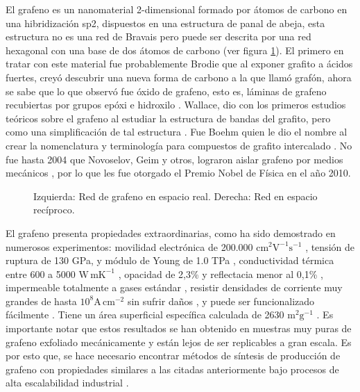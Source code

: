 El grafeno es un nanomaterial 2-dimensional formado por átomos de carbono en una hibridización sp2, dispuestos en una estructura de panal de abeja, esta estructura no es una red de Bravais pero puede ser descrita por una red hexagonal con una base de dos átomos de carbono (ver figura \ref{fig_graphene_lattice}). El primero en tratar con este material fue probablemente Brodie \citep{Brodie1859} que al exponer grafito a ácidos fuertes, creyó descubrir una nueva forma de carbono a la que llamó grafón, ahora se sabe que lo que observó fue óxido de grafeno, esto es, láminas de grafeno recubiertas por grupos epóxi e hidroxilo \citep{Geim2012}. Wallace, dio con los primeros estudios teóricos sobre el grafeno al estudiar la estructura de bandas del grafito, pero como una simplificación de tal estructura \citep{Wallace1947}. Fue Boehm quien le dio el nombre al crear la nomenclatura y terminología para compuestos de grafito intercalado \citep{Boehm1986}. No fue hasta 2004 que Novoselov, Geim y otros, lograron aislar grafeno por medios mecánicos \citep{Novoselov2004}, por lo que les fue otorgado el Premio Nobel de Física en el año 2010.

\begin{figure}
	\centering
	\caption{Izquierda: Red de grafeno en espacio real. Derecha: Red en espacio recíproco.}
	\label{fig_graphene_lattice}
\end{figure}
El grafeno presenta propiedades extraordinarias, como ha sido demostrado en numerosos experimentos: movilidad electrónica de 200.000 $\mathrm{cm^2 V^{-1} s^{-1} }$ \citep{Bolotin2008}, tensión de ruptura de 130 GPa, y módulo de Young de 1.0 TPa \citep{Lee2008}, conductividad térmica entre 600 a 5000 $\mathrm{W\, mK^{-1}}$ \citep{Balandin2011}, opacidad de 2,3\% y reflectacia menor al 0,1\% \citep{Nair2008}, impermeable totalmente a gases estándar \citep{Bunch2007}, resistir densidades de corriente muy grandes de hasta $\mathrm{10^8 A\, cm^{-2}}$ sin sufrir daños  \citep{Moser2007}, y puede ser funcionalizado fácilmente \citep{Loh2010}. Tiene un área superficial específica calculada de 2630 $\mathrm{m^2 g^{-1}}$ \citep{Peigney2001}. Es importante notar que estos resultados se han obtenido en muestras muy puras de grafeno exfoliado mecánicamente \citep{Novoselov2004} y están lejos de ser replicables a gran escala. Es por esto que, se hace necesario encontrar métodos de síntesis de producción de grafeno con propiedades similares a las citadas anteriormente bajo procesos de alta escalabilidad industrial \citep{Novoselov2012}.

